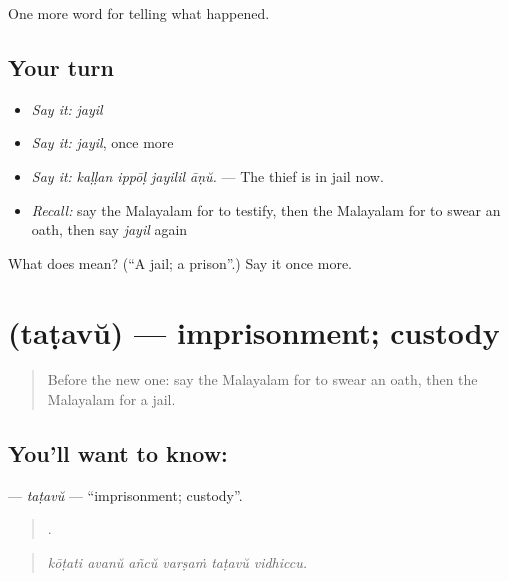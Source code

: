 \begin{grammarlens}[title={What you've built}]
One more word for telling what happened.
\end{grammarlens}

\subsection*{Your turn}
\begin{itemize}
\raggedright
  \item \emph{Say it:} \emph{jayil}
  \item \emph{Say it:} \emph{jayil}, once more
  \item \emph{Say it:} \emph{kaḷḷan ippōḷ jayilil āṇŭ.} — The thief is in jail now.
  \item \emph{Recall:} say the Malayalam for to testify, then the Malayalam for to swear an oath, then say \emph{jayil} again
\end{itemize}

\begin{tcolorbox}[breakable,colback=teal!4,colframe=teal!35!black,title={Before you move on}]
What does  mean? (\textquotedblleft{}A jail; a prison\textquotedblright{}.) Say it once more.
\end{tcolorbox}
\section[\texorpdfstring{\ml{തടവ്} (taṭavŭ)}{തടവ് (taṭavŭ)}]{ (taṭavŭ) — imprisonment; custody}

\label{lesson:ML-C371-tatavu}



\begin{quote}
Before the new one: say the Malayalam for to swear an oath, then the Malayalam for a jail.
\end{quote}

\subsection*{You'll want to know: }
\textbf{} — \emph{taṭavŭ} — \textquotedblleft{}imprisonment; custody\textquotedblright{}.

\begin{quote}
     .
\end{quote}

\begin{quote}
\emph{kōṭati avanŭ añcŭ varṣaṁ taṭavŭ vidhiccu.}
\end{quote}

